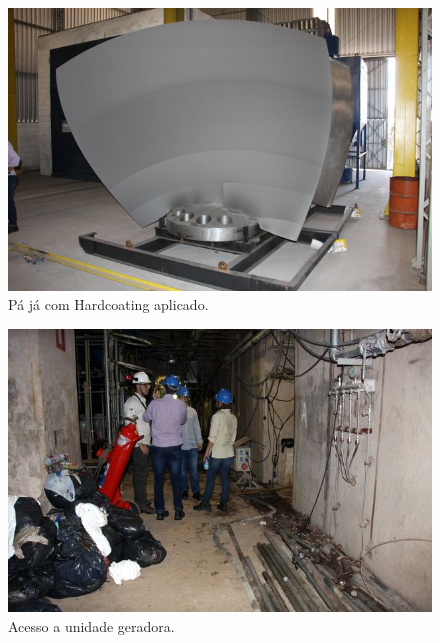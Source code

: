 \documentclass[a4paper,11pt,oneside,openany,brazilian,version=last,draft=false,]{main}
\begin{document}
\begin{twocolumn}
\begin{figure}[H]
\centering
\includegraphics[width=\columnwidth]{Fotos/img_4886.jpg}
\caption{Pá já com Hardcoating aplicado.}
\label{fig:gull}
\end{figure}
\begin{figure}[H]
\centering
\includegraphics[width=\columnwidth]{Fotos/img_4905.jpg}
\caption{Acesso a unidade geradora.}
\end{figure}


% 


\end{twocolumn}
\end{document}
